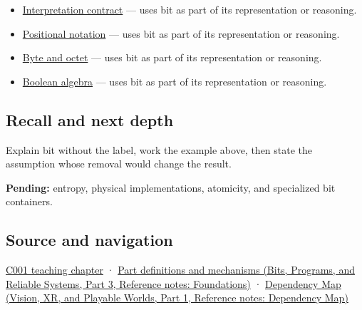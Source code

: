 \begin{itemize}
\tightlist
\item
  \hyperref[appendix-f414bd4ed05c]{Interpretation contract} --- uses bit as part of its representation or reasoning.
\item
  \hyperref[appendix-83c3f28f7bda]{Positional notation} --- uses bit as part of its representation or reasoning.
\item
  \hyperref[appendix-5bee2df85484]{Byte and octet} --- uses bit as part of its representation or reasoning.
\item
  \hyperref[appendix-24475e1596a8]{Boolean algebra} --- uses bit as part of its representation or reasoning.
\end{itemize}

\subsection{Recall and next depth}\label{appendix-ddbb69998a2e-recall-and-next-depth}

\hypertarget{appendix-ddbb69998a2e-recall-and-next-depth}{}

Explain bit without the label, work the example above, then state the assumption whose removal would change the result.

\textbf{Pending:} entropy, physical implementations, atomicity, and specialized bit containers.

\subsection{Source and navigation}\label{appendix-ddbb69998a2e-source-and-navigation}

\hypertarget{appendix-ddbb69998a2e-source-and-navigation}{}

\hyperref[01-foundations-i-ch001-from-a-signal-to-an-interpretation]{C001 teaching chapter} · \href{../01-Bits-Programs-and-Reliable-Systems-P03/main.pdf\#nameddest=appendix-fd090d982a15}{Part definitions and mechanisms (Bits, Programs, and Reliable Systems, Part 3, Reference notes: Foundations)} · \href{../07-Vision-XR-and-Playable-Worlds-P01/main.pdf\#nameddest=appendix-4ad47bdd269a}{Dependency Map (Vision, XR, and Playable Worlds, Part 1, Reference notes: Dependency Map)}
